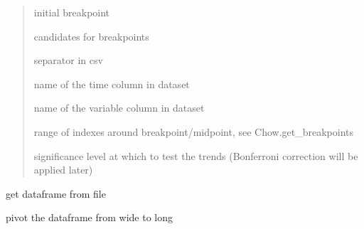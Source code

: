 \documentclass[letterpaper,10pt,english]{sphinxmanual}
\begin{document}
\begin{fulllineitems}
\begin{quote}
\begin{description}
\sphinxAtStartPar
initial breakpoint

\sphinxAtStartPar
candidates for breakpoints

\sphinxAtStartPar
separator in csv

\sphinxAtStartPar
name of the time column in dataset

\sphinxAtStartPar
name of the variable column in dataset

\sphinxAtStartPar
range of indexes around breakpoint/midpoint, see Chow.get\_breakpoints

\sphinxAtStartPar
significance level at which to test the trends (Bonferroni correction will be applied later)

\end{description}\end{quote}

\begin{fulllineitems}
\label{\detokenize{source/chowclassifier:chowclassifier.chow.ChewData.get_df}}
\pysigstartsignatures
{}
\pysigstopsignatures
\sphinxAtStartPar
get dataframe from file

\end{fulllineitems}


\begin{fulllineitems}
\label{\detokenize{source/chowclassifier:chowclassifier.chow.ChewData.melt}}
\pysigstartsignatures
{}
\pysigstopsignatures
\sphinxAtStartPar
pivot the dataframe from wide to long

\end{fulllineitems}



\end{fulllineitems}
\end{document}
